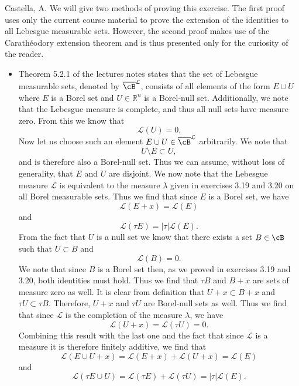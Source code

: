 \begin{solution}[4.10]{Castella, A.}
    We will give two methods of proving this exercise. The first proof uses only the current course material to prove the extension of the identities to all Lebesgue measurable sets. However, the second proof makes use of the Carath\'{e}odory extension theorem and is thus presented only for the curiosity of the reader.
    \begin{itemize}
        \item Theorem 5.2.1 of the lectures notes states that the set of Lebesgue measurable sets, denoted by $\overline{\cB}^\mathcal{L}$, consists of all elements of the form $E\cup U$ where $E$ is a Borel set and $U \in \mathbb{R}^n$ is a Borel-null set. Additionally, we note that the Lebesgue measure is complete, and thus all null sets have measure zero. From this we know that
        $$
            \mathcal{L}(U) = 0.
        $$
        Now let us choose such an element $E\cup U \in \overline{\cB}^\mathcal{L}$ arbitrarily. We note that
        $$
            U \setminus E \subset U,
        $$
        and is therefore also a Borel-null set. Thus we can assume, without loss of generality, that $E$ and $U$ are disjoint. We now note that the Lebesgue measure $\mathcal{L}$ is equivalent to the measure $\lambda$ given in exercises 3.19 and 3.20 on all Borel measurable sets. Thus we find that since $E$ is a Borel set, we have
        $$
            \mathcal{L}(E + x) = \mathcal{L}(E)
        $$
        and
        $$
            \mathcal{L}(\tau E) = |\tau|\mathcal{L}(E).
        $$
        From the fact that $U$ is a null set we know that there exists a set $B \in \cB$ such that $U \subset B$ and
        $$
            \mathcal{L}(B) = 0.
        $$
        We note that since $B$ is a Borel set then, as we proved in exercises 3.19 and 3.20, both identities must hold. Thus we find that $\tau B$ and $B + x$ are sets of measure zero as well. It is clear from definition that $U + x \subset B + x$ and $\tau U \subset \tau B$. Therefore, $U + x$ and $\tau  U$ are Borel-null sets as well. Thus we find that since $\mathcal{L}$ is the completion of the measure $\lambda$, we have
        $$
            \mathcal{L}(U + x) = \mathcal{L}(\tau U) = 0.
        $$
        Combining this result with the last one and the fact that since $\mathcal{L}$ is a measure it is therefore finitely additive, we find that
        $$
            \mathcal{L}(E \cup U + x) = \mathcal{L}(E + x) + \mathcal{L}(U + x) = \mathcal{L}(E)
        $$
        and
        $$
            \mathcal{L}(\tau E\cup U) = \mathcal{L}(\tau E) + \mathcal{L}(\tau U) = |\tau|\mathcal{L}(E).
$$
\end{itemize}
\end{solution}
